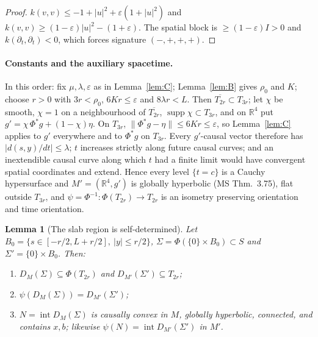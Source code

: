 \documentclass[11pt]{article}
\newtheorem{lemma}[theorem]{Lemma}
\theoremstyle{definition}
\begin{document}
\begin{proof}
$k(v,v)\le-1+|u|^2+\varepsilon(1+|u|^2)$ and $k(v,v)\ge(1-\varepsilon)|u|^2-
(1+\varepsilon)$. The spatial block is $\ge(1-\varepsilon)I>0$ and
$k(\partial_t,\partial_t)<0$, which forces signature $(-,+,+,+)$.
\end{proof}

\paragraph{Constants and the auxiliary spacetime.} In this order: fix
$\mu,\lambda,\varepsilon$ as in Lemma~\ref{lem:C}; Lemma~\ref{lem:B} gives
$\rho_0$ and $K$; choose $r>0$ with $3r<\rho_0$, $6Kr\le\varepsilon$ and
$8\lambda r<L$. Then $\overline{T_{2r}}\subset T_{3r}$; let $\chi$ be smooth,
$\chi=1$ on a neighbourhood of $\overline{T_{2r}}$,
$\operatorname{supp}\chi\subset T_{3r}$, and on
$\mathbb R^4$ put $g'=\chi\,\Phi^*g+(1-\chi)\eta$. On $T_{3r}$,
$\|\Phi^*g-\eta\|\le6Kr\le\varepsilon$, so Lemma~\ref{lem:C} applies to $g'$
everywhere and to $\Phi^*g$ on $T_{3r}$. Every $g'$-causal vector therefore
has $|d(s,y)/dt|\le\lambda$; $t$ increases strictly along future causal
curves; and an inextendible causal curve along which $t$ had a finite limit
would have convergent spatial coordinates and extend. Hence every level
$\{t=c\}$ is a Cauchy hypersurface and $M'=(\mathbb R^4,g')$ is globally
hyperbolic (MS Thm.~3.75), flat outside $T_{3r}$, and
$\psi=\Phi^{-1}:\Phi(T_{2r})\to T_{2r}$ is an isometry preserving orientation
and time orientation.

\begin{lemma}[The slab region is self-determined]\label{lem:D}
Let $B_0=\{s\in[-r/2,L+r/2],\ |y|\le r/2\}$, $\Sigma=\Phi(\{0\}\times B_0)\subset
S$ and $\Sigma'=\{0\}\times B_0$. Then:
\begin{enumerate}
\item[(i)] $D_M(\Sigma)\subseteq\Phi(T_{2r})$ and $D_{M'}(\Sigma')\subseteq T_{2r}$;
\item[(ii)] $\psi(D_M(\Sigma))=D_{M'}(\Sigma')$;
\item[(iii)] $N=\operatorname{int}D_M(\Sigma)$ is causally convex in $M$,
globally hyperbolic, connected, and contains $x,b$; likewise
$\psi(N)=\operatorname{int}D_{M'}(\Sigma')$ in $M'$.
\end{enumerate}
\end{lemma}
\end{document}
